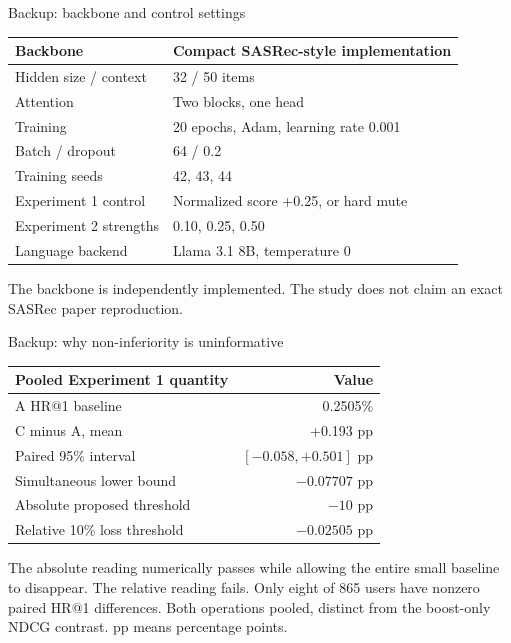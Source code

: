 \documentclass[10pt]{beamer}
\newcommand{\toprule}{\hline}
\newcommand{\midrule}{\hline}
\newcommand{\bottomrule}{\hline}
\newcommand{\src}[1]{\vfill{\tiny\color{bcitgray}#1}}
\begin{document}
\begin{frame}{Backup: backbone and control settings}
\begin{tabular}{@{}P{3.8cm}P{6.0cm}@{}}
\toprule
Backbone & Compact SASRec-style implementation\\\midrule
Hidden size / context & 32 / 50 items\\
Attention & Two blocks, one head\\
Training & 20 epochs, Adam, learning rate 0.001\\
Batch / dropout & 64 / 0.2\\
Training seeds & 42, 43, 44\\
Experiment 1 control & Normalized score +0.25, or hard mute\\
Experiment 2 strengths & 0.10, 0.25, 0.50\\
Language backend & Llama 3.1 8B, temperature 0\\\bottomrule
\end{tabular}\par
\src{The backbone is independently implemented. The study does not claim an exact SASRec paper reproduction.}
\end{frame}

\begin{frame}{Backup: why non-inferiority is uninformative}
\small
\begin{tabular}{@{}P{6.6cm}r@{}}
\toprule
Pooled Experiment 1 quantity & Value\\\midrule
A HR@1 baseline & 0.2505\%\\
C minus A, mean & +0.193 pp\\
Paired 95\% interval & $[-0.058,+0.501]$ pp\\
Simultaneous lower bound & $-0.07707$ pp\\
Absolute proposed threshold & $-10$ pp\\
Relative 10\% loss threshold & $-0.02505$ pp\\\bottomrule
\end{tabular}\par
\vspace{0.3cm}
The absolute reading numerically passes while allowing the entire small baseline to disappear. The relative reading fails. Only eight of 865 users have nonzero paired HR@1 differences.
\src{Both operations pooled, distinct from the boost-only NDCG contrast. pp means percentage points.}
\end{frame}
\end{document}
